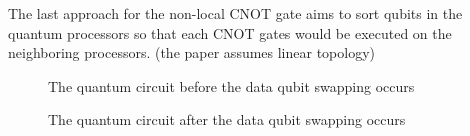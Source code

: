 The last approach for the non-local CNOT gate aims to sort qubits in the quantum processors so that each CNOT gates would be executed on the neighboring processors. (the paper \cite{distributedquantumcompiler} assumes linear topology)

\begin{figure}[ht]
  	\begin{center}

		\caption{The quantum circuit before the data qubit swapping occurs}
	\end{center}
\end{figure}
	
\begin{figure}[ht]
  	\begin{center}
		\caption{The quantum circuit after the data qubit swapping occurs}
	\end{center}
\end{figure}	

